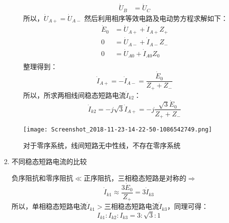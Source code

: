 \documentclass[blue]{elegantnote}
\begin{document}
\begin{enumerate}
\begin{itemize}
\begin{displaymath}
\begin{aligned}
		    \dot{U}_{B}&=\dot{U}_{C}
	    \end{aligned}
	    \end{displaymath}
	    所以，{\color{blue}$\boxed{\dot{U}_{A+}=\dot{U}_{A-}}$}
	    然后利用相序等效电路及电动势方程求解如下：
		\begin{displaymath}
		\begin{aligned}
		\dot{E}_0&=\dot{U}_{A+}+\dot{I}_{A+}Z_{+}\\
		0&=\dot{U}_{A-}+\dot{I}_{A-}Z_{-}\\	
		0&=\dot{U}_{A0}+\dot{I}_{A0}Z_{0}\\	
		\end{aligned}
		\end{displaymath}
		整理得到：
		$$\dot{I}_{A+}=-\dot{I}_{A-}=\frac{\dot{E}_{0}}{Z_{+}+Z_{-}}$$
		所以，所求两相线间稳态短路电流$\dot{I}_{k2}$：
		$$\dot{I}_{k2}=-j\sqrt{3}\dot{I}_{A+}=-j\frac{\sqrt{3}\dot{E}_{0}}{Z_{+}+Z_{-}}$$
		\begin{center}
			\texttt{[image: Screenshot\_2018-11-23-14-22-50-1086542749.png]}
		\end{center}
		\begin{note}
			对于零序系统，线间短路无中性线，不存在零序系统
		\end{note}
	\end{itemize}
	\item 不同稳态短路电流的比较
		\begin{note}
			负序阻抗和零序阻抗$\ll$正序阻抗，三相稳态短路是对称的$\Longrightarrow$  $$\dot{I}_{k1}\approx \frac{3\dot{E}_{0}}{Z_{+}}=3\dot{I}_{k3}$$所以，单相稳态短路电流$\dot{I}_{k1}>\text{三相稳态短路电流}\dot{I}_{k3}$，同理可得：$$I_{k1}:I_{k2}:I_{k3}=3:\sqrt{3}:1$$
		\end{note}	
\end{enumerate}
\end{document}
